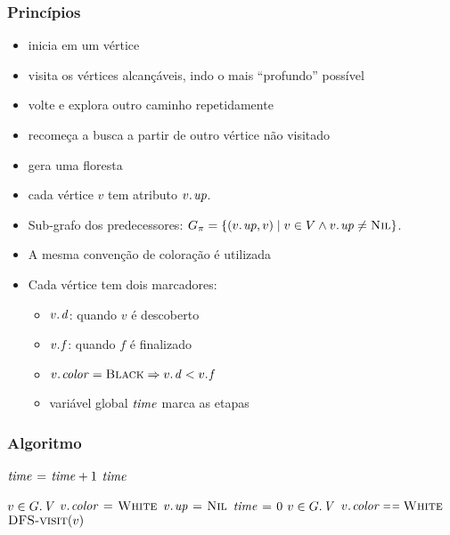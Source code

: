 \documentclass{beamer}
\begin{document}
\begin{frame}
\frametitle{Princípios}

\begin{itemize}
\item inicia em um vértice
\item visita os vértices alcançáveis, indo o mais ``profundo'' possível
\item volte e explora outro caminho repetidamente
\item recomeça a busca a partir de outro vértice não visitado
\item gera uma floresta
\item cada vértice $v$ tem atributo $\attrib{v}{up}$.
\item Sub-grafo dos predecessores: $G_\pi = \{ (\attrib{v}{up}, v) \mid v \in V \land \attrib{v}{up} \neq \const{Nil} \}$.
\item A mesma convenção de coloração é utilizada
\item Cada vértice tem dois marcadores: 
\begin{itemize}
\item $\attrib{v}{d}$: quando $v$ é descoberto
\item $\attrib{v}{f}$: quando $f$ é finalizado
\item $\attrib{v}{color} = \const{Black} \Rightarrow \attrib{v}{d} < \attrib{v}{f}$
\item variável global $\id{time}$ marca as etapas
\end{itemize}
\end{itemize}
\end{frame}

\begin{frame}
\frametitle{Algoritmo}

\begin{codebox}
\zi $\id{time} \gets \id{time} + 1$
\zi \Return $\id{time}$
\end{codebox}

\begin{codebox}
\zi \For $v \in \attrib{G}{V}$
\zi \Do $\attrib{v}{color} \gets \const{White}$
\zi   $\attrib{v}{up} \gets \const{Nil}$
    \End
\zi $\id{time} \gets 0$
\zi \For $v \in \attrib{G}{V}$
\zi \Do \If $\attrib{v}{color} \isequal \const{White}$
\zi   \Then $\textnormal{\scshape DFS-visit}(v)$
      \End
    \End
\end{codebox}

\end{frame}
\end{document}
